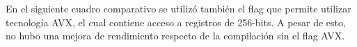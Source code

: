 \documentclass[a4paper]{article}
\begin{document}
En el siguiente cuadro comparativo se utilizó también el flag que permite utilizar tecnología AVX, el cual contiene acceso
a registros de 256-bits. A pesar de esto, no hubo una mejora de rendimiento respecto de la compilación sin el flag AVX.
\begin{figure}[!ht]
    \centering
    \begin{floatrow}
    \end{floatrow}
\end{figure}
\end{document}
